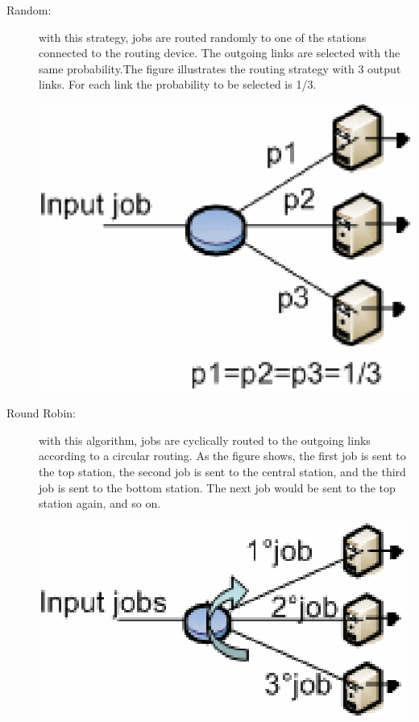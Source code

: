 \begin{description}
\item[Random:] with this strategy, jobs are routed randomly to one of the stations connected to the routing device. The outgoing links are selected with the same probability.The figure illustrates the routing strategy with 3 output links. For each link the probability to be selected is 1/3.
\begin{center}
\includegraphics[scale=.5]{img/jsim/random.eps}
\end{center}
\item[Round Robin:] with this algorithm, jobs are cyclically routed to the outgoing links according to a circular routing. As the figure shows, the first job is sent to the top station, the second job is sent to the central station, and the third job is sent to the bottom station. The next job would be sent to the top station again, and so on.
\begin{center}
\includegraphics[scale=.5]{img/jsim/round_robin.eps}
\end{center}

\end{description}
